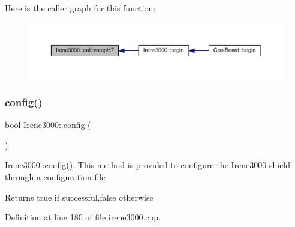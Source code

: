 Here is the caller graph for this function\+:\nopagebreak
\begin{figure}[H]
\begin{center}
\leavevmode
\includegraphics[width=350pt]{d6/d03/class_irene3000_a1d3299202e4cb7afcff9c9e3e95d94c1_icgraph}
\end{center}
\end{figure}
\mbox{\label{class_irene3000_afed5c35e4b23963c157847ef27c11e9c}} 
\subsubsection{\texorpdfstring{config()}{config()}}
{\footnotesize\ttfamily bool Irene3000\+::config (\begin{DoxyParamCaption}{ }\end{DoxyParamCaption})}

\hyperlink{class_irene3000_afed5c35e4b23963c157847ef27c11e9c}{Irene3000\+::config()}\+: This method is provided to configure the \hyperlink{class_irene3000}{Irene3000} shield through a configuration file

\begin{DoxyReturn}{Returns}
true if successful,false otherwise 
\end{DoxyReturn}


Definition at line 180 of file irene3000.\+cpp.


